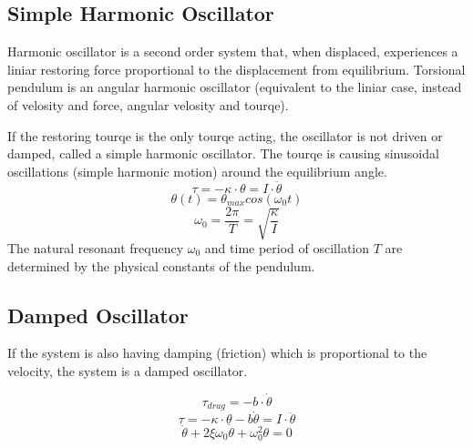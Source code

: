 \documentclass[\main/master.tex]{subfiles}
\begin{document}
\subsection{Simple Harmonic Oscillator}
Harmonic oscillator is a second order system that, when displaced, experiences a liniar restoring force proportional to the displacement from equilibrium. Torsional pendulum is an angular harmonic oscillator (equivalent to the liniar case, instead of velosity and force, angular velosity and tourqe).
\par

If the restoring tourqe is the only tourqe acting, the oscillator is not driven or damped, called a simple harmonic oscillator. The tourqe is causing sinusoidal oscillations (simple harmonic motion) around the equilibrium angle.  
\begin{equation}
\tau = -\kappa\cdot\theta  = I\cdot\ddot{\theta}   \label{eqn:undamped_motion_equation}
\end{equation}
\begin{equation}
\theta(t) = \theta_{max}cos(\omega_0 t )    \label{eqn:undamped_motion_equation}
\end{equation}
\begin{equation}
\omega_0  = \frac{2\pi}{T} = \sqrt{\frac{\kappa}{I}}   \label{eqn:undamped_motion_equation}
\end{equation}
The natural resonant frequency $\omega_0$ and time period of oscillation $T$ are determined by the physical constants of the pendulum.
\subsection{Damped Oscillator}
If the system is also having damping (friction) which is proportional to the velocity, the system is a damped oscillator.


\begin{equation}
\tau_{drag} = -b\cdot\dot{\theta}   \label{eqn:friction_tourqe}
\end{equation} 
\begin{equation}
\tau = -\kappa\cdot\theta - b\dot{\theta}  = I\cdot\ddot{\theta}   \label{eqn:damped_motion_equation}
\end{equation} 
\begin{equation}
\ddot{\theta} + 2\xi\omega_0\dot{\theta} + \omega_0^2\theta = 0   \label{eqn:damped_motion_equation}
\end{equation}
\end{document}
